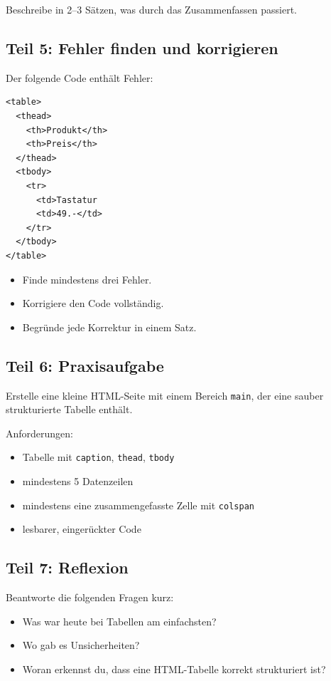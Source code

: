 \documentclass[a4paper,12pt]{article}
\begin{document}
Beschreibe in 2--3 Sätzen, was durch das Zusammenfassen passiert.

\subsection*{Teil 5: Fehler finden und korrigieren}
Der folgende Code enthält Fehler:

\begin{verbatim}
<table>
  <thead>
    <th>Produkt</th>
    <th>Preis</th>
  </thead>
  <tbody>
    <tr>
      <td>Tastatur
      <td>49.-</td>
    </tr>
  </tbody>
</table>
\end{verbatim}

\begin{itemize}
  \item Finde mindestens drei Fehler.
  \item Korrigiere den Code vollständig.
  \item Begründe jede Korrektur in einem Satz.
\end{itemize}

\subsection*{Teil 6: Praxisaufgabe}
Erstelle eine kleine HTML-Seite mit einem Bereich \texttt{main}, der eine sauber strukturierte Tabelle enthält.

Anforderungen:
\begin{itemize}
  \item Tabelle mit \texttt{caption}, \texttt{thead}, \texttt{tbody}
  \item mindestens 5 Datenzeilen
  \item mindestens eine zusammengefasste Zelle mit \texttt{colspan}
  \item lesbarer, eingerückter Code
\end{itemize}

\subsection*{Teil 7: Reflexion}
Beantworte die folgenden Fragen kurz:
\begin{itemize}
  \item Was war heute bei Tabellen am einfachsten?
  \item Wo gab es Unsicherheiten?
  \item Woran erkennst du, dass eine HTML-Tabelle korrekt strukturiert ist?
\end{itemize}
\end{document}
